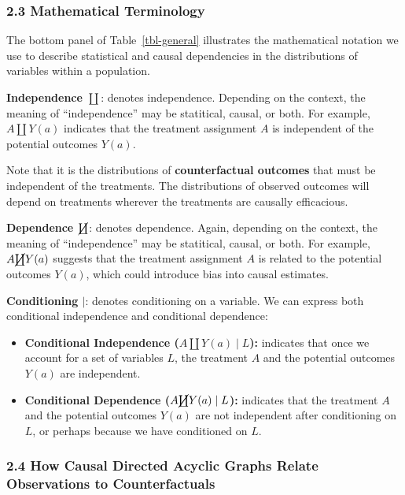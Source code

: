 \documentclass[
  single column]{article}
\providecommand{\tightlist}{%
  \setlength{\itemsep}{0pt}\setlength{\parskip}{0pt}}\usepackage{longtable,booktabs,array}
\begin{document}
\subsubsection{2.3 Mathematical
Terminology}\label{mathematical-terminology}

The bottom panel of Table~\ref{tbl-general} illustrates the mathematical
notation we use to describe statistical and causal dependencies in the
distributions of variables within a population.

\textbf{Independence \(\coprod\)}: denotes independence. Depending on
the context, the meaning of ``independence'' may be statitical, causal,
or both. For example, \(A \coprod Y(a)\) indicates that the treatment
assignment \(A\) is independent of the potential outcomes \(Y(a)\).

Note that it is the distributions of \textbf{counterfactual outcomes}
that must be independent of the treatments. The distributions of
observed outcomes will depend on treatments wherever the treatments are
causally efficacious.

\textbf{Dependence \(\cancel{\coprod}\)}: denotes dependence. Again,
depending on the context, the meaning of ``independence'' may be
statitical, causal, or both. For example, \(A \cancel{\coprod} Y(a)\)
suggests that the treatment assignment \(A\) is related to the potential
outcomes \(Y(a)\), which could introduce bias into causal estimates.

\textbf{Conditioning \(|\)}: denotes conditioning on a variable. We can
express both conditional independence and conditional dependence:

\begin{itemize}
\tightlist
\item
  \textbf{Conditional Independence (\(A \coprod Y(a) \mid L\)):}
  indicates that once we account for a set of variables \(L\), the
  treatment \(A\) and the potential outcomes \(Y(a)\) are independent.
\item
  \textbf{Conditional Dependence (\(A \cancel{\coprod} Y(a) \mid L\)):}
  indicates that the treatment \(A\) and the potential outcomes \(Y(a)\)
  are not independent after conditioning on \(L\), or perhaps because we
  have conditioned on \(L\).
\end{itemize}

\subsubsection{2.4 How Causal Directed Acyclic Graphs Relate
Observations to
Counterfactuals}\label{how-causal-directed-acyclic-graphs-relate-observations-to-counterfactuals}
\end{document}
